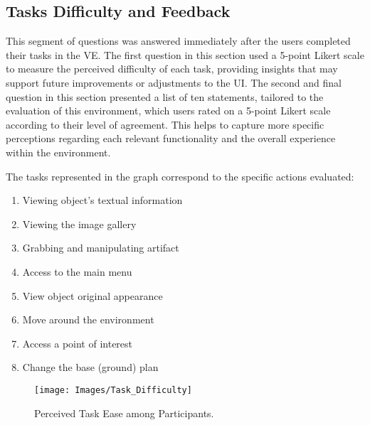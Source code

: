 




\subsection{Tasks Difficulty and Feedback}

This segment of questions was answered immediately after the users completed their tasks in the \gls{VE}.
The first question in this section used a 5-point Likert scale to measure the perceived difficulty of each task, providing insights that may support future improvements or adjustments to the \gls{UI}.
The second and final question in this section presented a list of ten statements, tailored to the evaluation of this environment, which users rated on a 5-point Likert scale according to their level of agreement.
This helps to capture more specific perceptions regarding each relevant functionality and the overall experience within the environment.

The tasks represented in the graph correspond to the specific actions evaluated:

\begin{enumerate}[label=T\arabic* --]
    \item Viewing object's textual information
    \item Viewing the image gallery
    \item Grabbing and manipulating artifact
    \item Access to the main menu
    \item View object original appearance
    \item Move around the environment
    \item Access a point of interest
    \item Change the base (ground) plan
\end{enumerate}


\begin{figure}[h!]
    \centering
    \texttt{[image: Images/Task\_Difficulty]}
    \caption{Perceived Task Ease among Participants.} 
    \label{fig:diffculty}
\end{figure}


